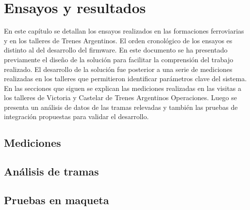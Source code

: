 
\chapter{Ensayos y resultados} %
En este capítulo se detallan los ensayos realizados en las formaciones ferroviarias y en los talleres de Trenes Argentinos. El orden cronológico de los ensayos es distinto al del desarrollo del firmware. En este documento se ha presentado previamente el diseño de la solución para facilitar la comprensión del trabajo realizado. El desarrollo de la solución fue posterior a una serie de mediciones realizadas en los talleres que permitieron identificar parámetros clave del sistema. \\

En las secciones que siguen se explican las mediciones realizadas en las visitas a los talleres de Victoria y Castelar de Trenes Argentinos Operaciones. Luego se presenta un análisis de datos de las tramas relevadas y también las pruebas de integración propuestas para validar el desarrollo. \\


\label{Chapter4} %


\section{Mediciones}

\section{Análisis de tramas}

\section{Pruebas en maqueta}

